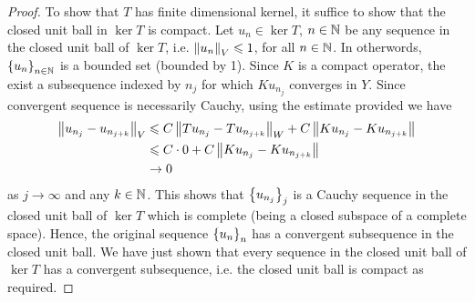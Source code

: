 \documentclass[12pt]{article}
\begin{document}
\begin{proof}
    To show that $T$ has finite dimensional kernel, it suffice to show that the closed unit ball in $\ker T$ is compact. Let $u_n \in \ker T$, $n \in \N$ be any sequence in the closed unit ball of $\ker T$, i.e. $\norm[u_n]_V \leq 1$, for all $n \in \N$. In otherwords,  $\set{u_n}_{n \in \N}$ is a bounded set (bounded by 1). Since $K$ is a compact operator,  the exist a subsequence indexed by $n_j$ for which $Ku_{n_j}$ converges in $Y$. Since convergent sequence is necessarily Cauchy, using the estimate provided we have
    \begin{align*}
    \norm[u_{n_j} - u_{n_{j + k}}]_V
     & \leq C \norm[T u_{n_j} - T u_{n_{j + k}}]_{W} + C \norm[K u_{n_j} - K u_{n_{j + k}}]\\
     & \leq C \cdot 0 + C \norm[K u_{n_j} - K u_{n_{j + k}}]\\
     & \to 0
    \end{align*}
    as $j \to \infty$ and any $k \in \N$. This shows that $\set{u_{n_j}}_j$ is a Cauchy sequence in the closed unit ball of $\ker T$ which is complete (being a closed subspace of a complete space). Hence, the original sequence $\set{u_n}_n$ has a convergent subsequence in the closed unit ball. We have just shown that every sequence in the closed unit ball of $\ker T$ has a convergent subsequence, i.e. the closed unit ball is compact as required. 
\end{proof}

%    
%    
\end{document}
